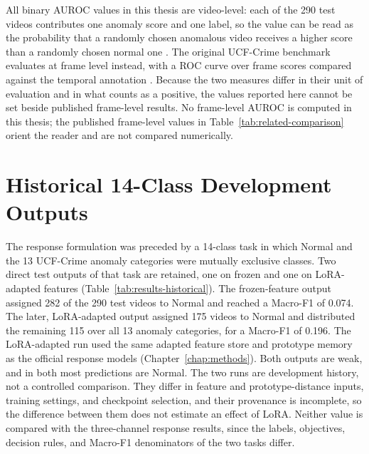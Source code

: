 All binary AUROC values in this thesis are video-level: each of the 290 test videos contributes one anomaly score and one label, so the value can be read as the probability that a randomly chosen anomalous video receives a higher score than a randomly chosen normal one \cite{fawcett2006introduction}. The original UCF-Crime benchmark evaluates at frame level instead, with a ROC curve over frame scores compared against the temporal annotation \cite{sultani2018real}. Because the two measures differ in their unit of evaluation and in what counts as a positive, the values reported here cannot be set beside published frame-level results. No frame-level AUROC is computed in this thesis; the published frame-level values in Table~\ref{tab:related-comparison} orient the reader and are not compared numerically.

\section{Historical 14-Class Development Outputs}
\label{sec:results-historical}

The response formulation was preceded by a 14-class task in which Normal and the 13 UCF-Crime anomaly categories were mutually exclusive classes. Two direct test outputs of that task are retained, one on frozen and one on LoRA-adapted features (Table~\ref{tab:results-historical}). The frozen-feature output assigned 282 of the 290 test videos to Normal and reached a Macro-F1 of 0.074. The later, LoRA-adapted output assigned 175 videos to Normal and distributed the remaining 115 over all 13 anomaly categories, for a Macro-F1 of 0.196. The LoRA-adapted run used the same adapted feature store and prototype memory as the official response models (Chapter~\ref{chap:methods}). Both outputs are weak, and in both most predictions are Normal. The two runs are development history, not a controlled comparison. They differ in feature and prototype-distance inputs, training settings, and checkpoint selection, and their provenance is incomplete, so the difference between them does not estimate an effect of LoRA. Neither value is compared with the three-channel response results, since the labels, objectives, decision rules, and Macro-F1 denominators of the two tasks differ.

